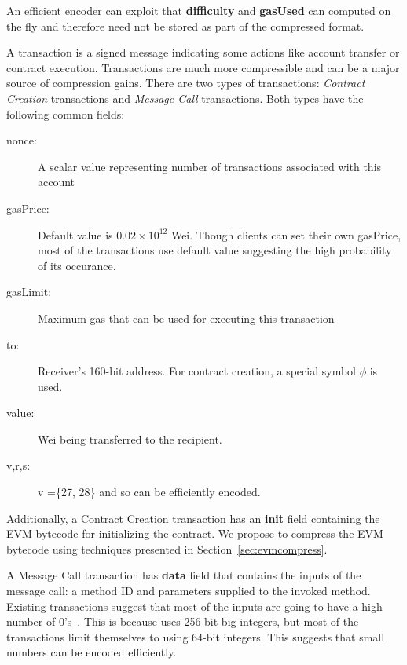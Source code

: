 An efficient encoder can exploit that \textbf{difficulty} and \textbf{gasUsed} can computed on the fly and therefore
need not be stored as part of the compressed format.

A transaction is a signed message indicating some actions like account transfer or contract execution.
Transactions are much more compressible and can be a major source of compression gains.
There are two types of transactions: {\em Contract Creation} transactions and {\em Message Call} transactions.
Both types have the following common fields:
\begin{description}
  \item[nonce:] A scalar value representing number of transactions associated with this account
  \item[gasPrice:] Default value is $0.02\times10^{12}$ Wei. Though clients can set their own gasPrice, most of the transactions use default value suggesting the high probability of its occurance.
  \item[gasLimit:] Maximum gas that can be used for executing this transaction
  \item[to:] Receiver's 160-bit address. For contract creation, a special symbol $\phi$ is used.
  \item[value:] Wei being transferred to the recipient.
  \item[v,r,s:] v =\{27, 28\} and so can be efficiently encoded.
\end{description}

Additionally, a Contract Creation transaction has an \textbf{init} field containing the EVM bytecode for initializing the contract.
We propose to compress the EVM bytecode using techniques presented in Section~\ref{sec:evmcompress}.

A Message Call transaction has \textbf{data} field that contains the inputs of the message call: a method ID and parameters supplied to the invoked method.
Existing transactions suggest that most of the inputs are going to have a high number of 0's~\cite{ethtx}. 
This is because \eth{} uses 256-bit big integers, but most of the transactions limit themselves to using 64-bit integers.
This suggests that small numbers can be encoded efficiently.